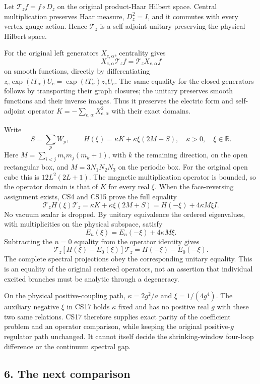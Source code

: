 \documentclass[11pt]{article}
\begin{document}
Let \(\mathcal T_z f=f\circ D_z\) on the original product-Haar Hilbert space. Central multiplication preserves Haar measure, \(D_z^2=I\), and it commutes with every vertex gauge action. Hence \(\mathcal T_z\) is a self-adjoint unitary preserving the physical Hilbert space.

For the original left generators \(X_{e,\alpha}\), centrality gives
\[
 X_{e,\alpha}\mathcal T_z f=\mathcal T_zX_{e,\alpha}f
 \tag{CS15}
\]
on smooth functions, directly by differentiating
\(z_e\exp(tT_\alpha)U_e=\exp(tT_\alpha)z_eU_e\).
The same equality for the closed generators follows by transporting their graph closures; the unitary preserves smooth functions and their inverse images. Thus it preserves the electric form and self-adjoint operator \(K=-\sum_{e,\alpha}X_{e,\alpha}^2\) with their exact domains.

Write
\[
 S=\sum_pW_p,\qquad
 H(\xi)=\kappa K+\kappa\xi(2M-S),\quad \kappa>0,\quad \xi\in\mathbb R.
 \tag{CS16}
\]
Here \(M=\sum_{i<j}m_im_j(m_k+1)\), with \(k\) the remaining direction, on the open rectangular box, and \(M=3N_1N_2N_3\) on the periodic box. For the original open cube this is \(12L^2(2L+1)\). The magnetic multiplication operator is bounded, so the operator domain is that of \(K\) for every real \(\xi\). When the face-reversing assignment exists, CS4 and CS15 prove the full equality
\[
 \mathcal T_zH(\xi)\mathcal T_z
 =\kappa K+\kappa\xi(2M+S)
 =H(-\xi)+4\kappa M\xi I.
 \tag{CS17}
\]
No vacuum scalar is dropped. By unitary equivalence the ordered eigenvalues, with multiplicities on the physical subspace, satisfy
\[
 E_n(\xi)=E_n(-\xi)+4\kappa M\xi.
 \tag{CS18}
\]
Subtracting the \(n=0\) equality from the operator identity gives
\[
 \mathcal T_z[H(\xi)-E_0(\xi)]\mathcal T_z
       =H(-\xi)-E_0(-\xi).
 \tag{CS19}
\]
The complete spectral projections obey the corresponding unitary equality. This is an equality of the original centered operators, not an assertion that individual excited branches must be analytic through a degeneracy.

On the physical positive-coupling path, \(\kappa=2g^2/a\) and \(\xi=1/(4g^4)\). The auxiliary negative \(\xi\) in CS17 holds \(\kappa\) fixed and has no positive real \(g\) with these two same relations. CS17 therefore supplies exact parity of the coefficient problem and an operator comparison, while keeping the original positive-\(g\) regulator path unchanged. It cannot itself decide the shrinking-window four-loop difference or the continuum spectral gap.

\subsection*{6. The next comparison}
\end{document}
